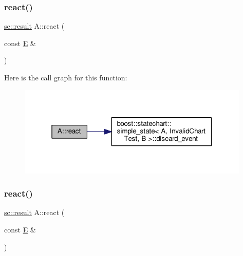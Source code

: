 \subsubsection{\texorpdfstring{react()}{react()}\hspace{0.1cm}{\footnotesize\ttfamily [3/11]}}
{\footnotesize\ttfamily \mbox{\hyperlink{namespaceboost_1_1statechart_abe807f6598b614d6d87bb951ecd92331}{sc\+::result}} A\+::react (\begin{DoxyParamCaption}\item[{const \mbox{\hyperlink{struct_e}{E}} \&}]{ }\end{DoxyParamCaption})\hspace{0.3cm}{\ttfamily [inline]}}

Here is the call graph for this function\+:
\nopagebreak
\begin{figure}[H]
\begin{center}
\leavevmode
\includegraphics[width=313pt]{struct_a_a7eaee5c73ef0a2a5fb0886b4b1bc4a48_cgraph}
\end{center}
\end{figure}
\mbox{\label{struct_a_a7eaee5c73ef0a2a5fb0886b4b1bc4a48}} 
\subsubsection{\texorpdfstring{react()}{react()}\hspace{0.1cm}{\footnotesize\ttfamily [4/11]}}
{\footnotesize\ttfamily \mbox{\hyperlink{namespaceboost_1_1statechart_abe807f6598b614d6d87bb951ecd92331}{sc\+::result}} A\+::react (\begin{DoxyParamCaption}\item[{const \mbox{\hyperlink{struct_e}{E}} \&}]{ }\end{DoxyParamCaption})\hspace{0.3cm}{\ttfamily [inline]}}

